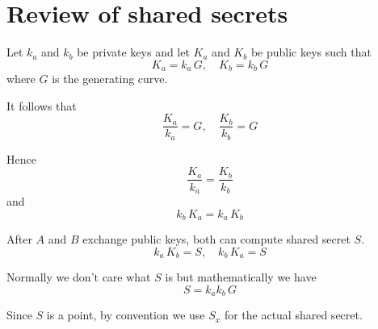 \documentclass[12pt]{article}
\begin{document}
\section*{Review of shared secrets}

Let $k_a$ and $k_b$ be private keys and let $K_a$ and $K_b$ be public keys such that
\begin{equation*}
K_a=k_a\,G,\quad K_b=k_b\,G
\end{equation*}
where $G$ is the generating curve.

\bigskip
It follows that
\begin{equation*}
\frac{K_a}{k_a}=G,\quad \frac{K_b}{k_b}=G
\end{equation*}

Hence
\begin{equation*}
\frac{K_a}{k_a}=\frac{K_b}{k_b}
\end{equation*}
and
\begin{equation*}
k_b\,K_a=k_a\,K_b
\end{equation*}

After $A$ and $B$ exchange public keys, both can compute shared secret $S$.
\begin{equation*}
k_a\,K_b=S,\quad k_b\,K_a=S
\end{equation*}

Normally we don't care what $S$ is but mathematically we have
\begin{equation*}
S=k_ak_b\,G
\end{equation*}

Since $S$ is a point, by convention we use $S_x$ for the actual shared secret.
\end{document}
